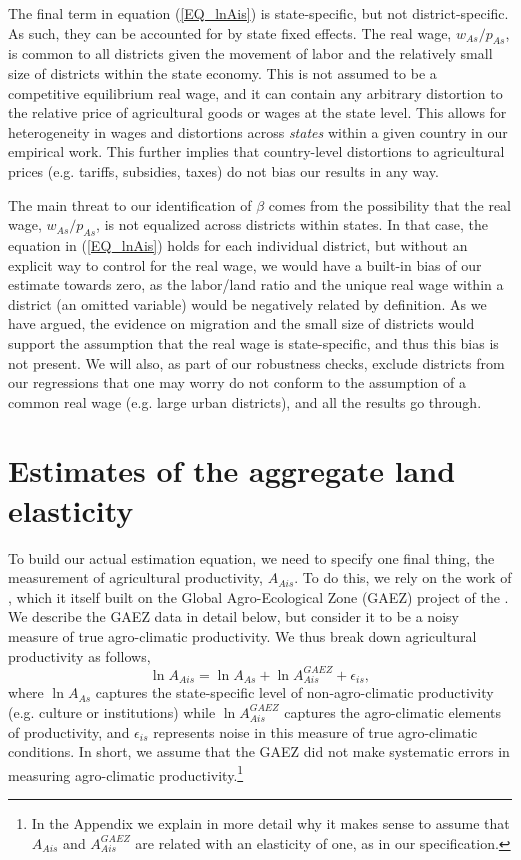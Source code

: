 \documentclass[11pt]{article}
\begin{document}
The final term in equation (\ref{EQ_lnAis}) is state-specific, but not district-specific. As such, they can be accounted for by state fixed effects. The real wage, $w_{As}/p_{As}$, is common to all districts given the movement of labor and the relatively small size of districts within the state economy. This is not assumed to be a competitive equilibrium real wage, and it can contain any arbitrary distortion to the relative price of agricultural goods or wages at the state level. This allows for heterogeneity in wages and distortions across \textit{states} within a given country in our empirical work. This further implies that country-level distortions to agricultural prices (e.g. tariffs, subsidies, taxes) do not bias our results in any way.

The main threat to our identification of $\beta$ comes from the possibility that the real wage, $w_{As}/p_{As}$, is not equalized across districts within states. In that case, the equation in (\ref{EQ_lnAis}) holds for each individual district, but without an explicit way to control for the real wage, we would have a built-in bias of our estimate towards zero, as the labor/land ratio and the unique real wage within a district (an omitted variable) would be negatively related by definition. As we have argued, the evidence on migration and the small size of districts would support the assumption that the real wage is state-specific, and thus this bias is not present. We will also, as part of our robustness checks, exclude districts from our regressions that one may worry do not conform to the assumption of a common real wage (e.g. large urban districts), and all the results go through.

\section{Estimates of the aggregate land elasticity}
To build our actual estimation equation, we need to specify one final thing, the measurement of agricultural productivity, $A_{Ais}$. To do this, we rely on the work of \cite{galorozak2016}, which it itself built on the Global Agro-Ecological Zone (GAEZ) project of the \cite{gaez}. We describe the GAEZ data in detail below, but consider it to be a noisy measure of true agro-climatic productivity. We thus break down agricultural productivity as follows,
\begin{equation*}
	\ln A_{Ais} = \ln A_{As} + \ln A^{GAEZ}_{Ais} + \epsilon_{is},
\end{equation*}
where $\ln A_{As}$ captures the state-specific level of non-agro-climatic productivity (e.g. culture or institutions) while $\ln A^{GAEZ}_{Ais}$ captures the agro-climatic elements of productivity, and $\epsilon_{is}$ represents noise in this measure of true agro-climatic conditions. In short, we assume that the GAEZ did not make systematic errors in measuring agro-climatic productivity.\footnote{In the Appendix we explain in more detail why it makes sense to assume that $A_{Ais}$ and $A^{GAEZ}_{Ais}$ are related with an elasticity of one, as in our specification.}
\end{document}
